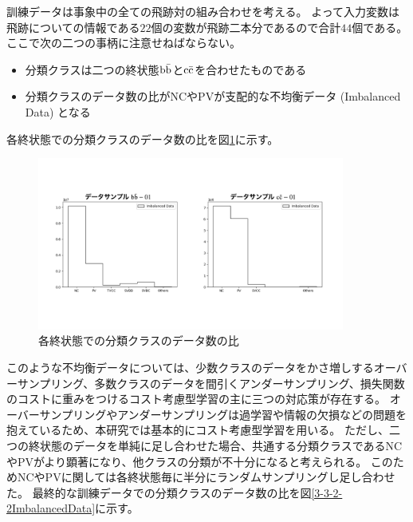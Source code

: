 訓練データは事象中の全ての飛跡対の組み合わせを考える。
よって入力変数は飛跡についての情報である$22$個の変数が飛跡二本分であるので合計$44$個である。
ここで次の二つの事柄に注意せねばならない。

\begin{itemize}
 \item 分類クラスは二つの終状態$\rm b\bar{b}$と$\rm c\bar{c}$を合わせたものである
 \item 分類クラスのデータ数の比がNCやPVが支配的な不均衡データ (Imbalanced Data) となる
\end{itemize}

各終状態での分類クラスのデータ数の比を図\ref{3-3-2-1ImbalancedData}に示す。

\begin{figure}[htbp]
 \centering
 \includegraphics[trim = 100 200 100 150, width=0.9\textwidth, clip]{Figure/3Networks/3-3-2-1ImbalancedData.png}
 \caption{各終状態での分類クラスのデータ数の比}
 \label{3-3-2-1ImbalancedData}
\end{figure}

このような不均衡データについては、少数クラスのデータをかさ増しするオーバーサンプリング、多数クラスのデータを間引くアンダーサンプリング、損失関数のコストに重みをつけるコスト考慮型学習の主に三つの対応策が存在する。
オーバーサンプリングやアンダーサンプリングは過学習や情報の欠損などの問題を抱えているため、本研究では基本的にコスト考慮型学習を用いる。
ただし、二つの終状態のデータを単純に足し合わせた場合、共通する分類クラスであるNCやPVがより顕著になり、他クラスの分類が不十分になると考えられる。
このためNCやPVに関しては各終状態毎に半分にランダムサンプリングし足し合わせた。
最終的な訓練データでの分類クラスのデータ数の比を図\ref{3-3-2-2ImbalancedData}に示す。

